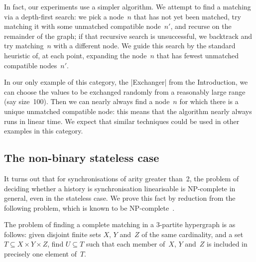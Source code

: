 

In fact, our experiments use a simpler algorithm.  We attempt to find a
matching via a depth-first search: we pick a node~$n$ that has not yet been
matched, try matching it with some unmatched compatible node~$n'$, and recurse
on the remainder of the graph; if that recursive search is unsuccessful, we
backtrack and try matching~$n$ with a different node.  We guide this search by
the standard heuristic of, at each point, expanding the node~$n$ that has
fewest unmatched compatible nodes~$n'$.  

In our only example of this category, the |Exchanger| from the Introduction,
we can choose the values to be exchanged randomly from a reasonably large
range (say size~100).  Then we can nearly always find a node~$n$ for which
there is a unique unmatched compatible node: this means that the algorithm
nearly always runs in linear time.  We expect that similar techniques could be
used in other examples in this category.



\subsection{The non-binary  stateless case}
\label{sec:non-binary-stateless}

It turns out that for synchronisations of arity greater than~2, the problem of
deciding whether a history is synchronisation linearisable is NP-complete in
general, even in the stateless case.  We prove this fact by reduction from the
following problem, which is known to be NP-complete~\cite{Karp1972}.
%
\begin{definition}
The problem of finding a complete matching in a 3-partite hypergraph is as
follows: given disjoint finite sets $X$, $Y$ and~$Z$ of the same cardinality,
and a set $T \subseteq X \times Y \times Z$, find $U \subseteq T$ such that
each member of~$X$, $Y$ and~$Z$ is included in precisely one element of~$T$.
\end{definition}

